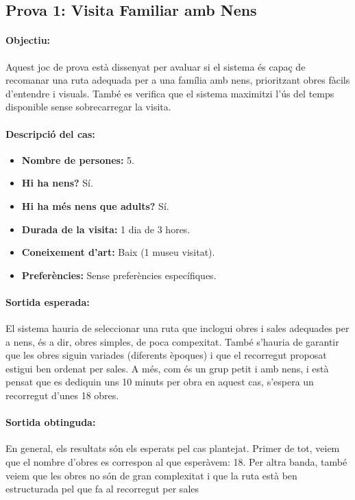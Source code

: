 \documentclass[a4paper]{article}
\begin{document}
	\subsection{Prova 1: Visita Familiar amb Nens}
	
	\paragraph{Objectiu:} 
	Aquest joc de prova està dissenyat per avaluar si el sistema és capaç de recomanar una ruta adequada per a una família amb nens, prioritzant obres fàcils d’entendre i visuals. També es verifica que el sistema maximitzi l’ús del temps disponible sense sobrecarregar la visita.
	
	\paragraph{Descripció del cas:} 
	
	\begin{itemize}
		\item \textbf{Nombre de persones:} 5.
		\item \textbf{Hi ha nens?} Sí.
		\item \textbf{Hi ha més nens que adults?} Sí.
		\item \textbf{Durada de la visita:} 1 dia de 3 hores.
		\item \textbf{Coneixement d’art:} Baix (1 museu visitat).
		\item \textbf{Preferències:} Sense preferències específiques.
	\end{itemize}
	
	\paragraph{Sortida esperada:}
	El sistema hauria de seleccionar una ruta que inclogui obres i sales adequades per a nens, és a dir, obres simples, de poca compexitat. També s’hauria de garantir que les obres siguin variades (diferents èpoques) i que el recorregut proposat estigui ben ordenat per sales. A més, com és un grup petit i amb nens, i està pensat que es dediquin uns 10 minuts per obra en aquest cas, s'espera un recorregut d'unes 18 obres.
	
	\paragraph{Sortida obtinguda:}
	En general, els resultats són els esperats pel cas plantejat. Primer de tot, veiem que el nombre d'obres es correspon al que esperàvem: 18. Per altra banda, també veiem que les obres no són de gran complexitat i que la ruta està ben estructurada pel que fa al recorregut per sales \\
	
\end{document}
